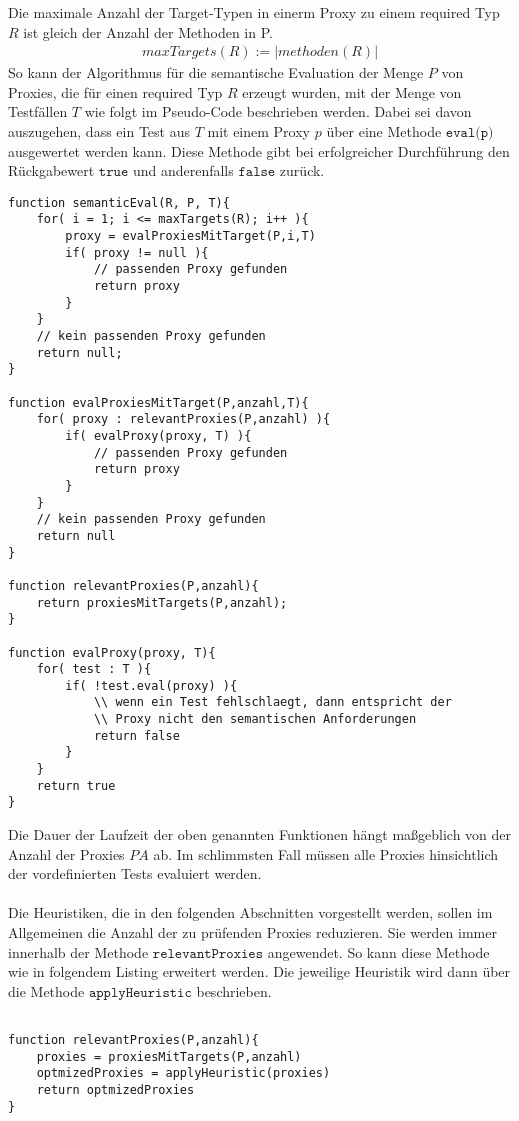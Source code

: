 \documentclass[a4paper,12pt]{article}
\begin{document}
Die maximale Anzahl der Target-Typen in einerm Proxy zu einem required Typ $R$ ist gleich der Anzahl der Methoden in P.
\begin{gather*}
maxTargets(R) := |\mathit{methoden(R)}|
\end{gather*}
So kann der Algorithmus für die semantische Evaluation der Menge $P$ von Proxies, die für einen required Typ $R$ erzeugt wurden, mit der Menge von Testfällen $T$ wie folgt im Pseudo-Code beschrieben werden. Dabei sei davon auszugehen, dass ein Test aus $T$ mit einem Proxy $p$ über eine Methode $\texttt{eval(p)}$ ausgewertet werden kann. Diese Methode gibt bei erfolgreicher Durchführung den Rückgabewert $\texttt{true}$ und anderenfalls $\texttt{false}$ zurück.
\begin{lstlisting}[style = dsl]
function semanticEval(R, P, T){
	for( i = 1; i <= maxTargets(R); i++ ){
		proxy = evalProxiesMitTarget(P,i,T)	
		if( proxy != null ){
			// passenden Proxy gefunden
			return proxy
		}
	}
	// kein passenden Proxy gefunden
	return null;
}

function evalProxiesMitTarget(P,anzahl,T){
	for( proxy : relevantProxies(P,anzahl) ){
		if( evalProxy(proxy, T) ){
			// passenden Proxy gefunden
			return proxy
		}
	}
	// kein passenden Proxy gefunden
	return null
}

function relevantProxies(P,anzahl){
	return proxiesMitTargets(P,anzahl);
}

function evalProxy(proxy, T){
	for( test : T ){
		if( !test.eval(proxy) ){
			\\ wenn ein Test fehlschlaegt, dann entspricht der 
			\\ Proxy nicht den semantischen Anforderungen
			return false
		}
	}
	return true
}
\end{lstlisting}
Die Dauer der Laufzeit der oben genannten Funktionen hängt maßgeblich von der Anzahl der Proxies $\mathit{PA}$ ab. Im schlimmsten Fall müssen alle Proxies hinsichtlich der vordefinierten Tests evaluiert werden.\\\\
Die Heuristiken, die in den folgenden Abschnitten vorgestellt werden, sollen im Allgemeinen die Anzahl der zu prüfenden Proxies reduzieren. Sie werden immer innerhalb der Methode $\texttt{relevantProxies}$ angewendet. So kann diese Methode wie in folgendem Listing erweitert werden. Die jeweilige Heuristik wird dann über die Methode $\texttt{applyHeuristic}$ beschrieben.
\begin{lstlisting}[style = dsl]

function relevantProxies(P,anzahl){
	proxies = proxiesMitTargets(P,anzahl)
	optmizedProxies = applyHeuristic(proxies)
	return optmizedProxies
}

\end{lstlisting}
\end{document}
